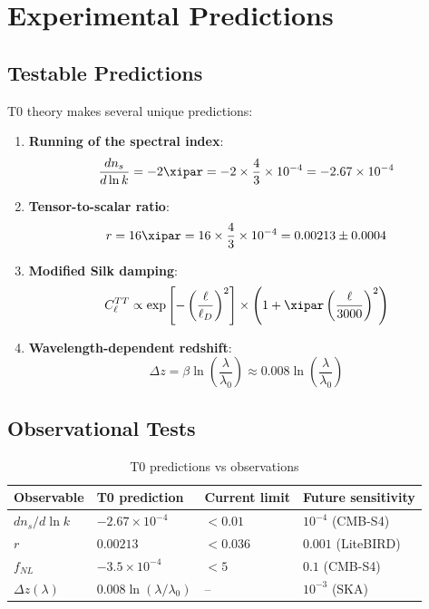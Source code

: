 	\section{Experimental Predictions}
	\label{sec:predictions}
	
	\subsection{Testable Predictions}
	
	T0 theory makes several unique predictions:
	
	\begin{enumerate}
		\item \textbf{Running of the spectral index}:
		\begin{equation}
			\frac{dn_s}{d\ln k} = -2\xipar = -2 \times \frac{4}{3} \times 10^{-4} = -2.67 \times 10^{-4}
		\end{equation}
		
		\item \textbf{Tensor-to-scalar ratio}:
		\begin{equation}
			r = 16\xipar = 16 \times \frac{4}{3} \times 10^{-4} = 0.00213 \pm 0.0004
		\end{equation}
		
		\item \textbf{Modified Silk damping}:
		\begin{equation}
			C_\ell^{TT} \propto \exp\left[-\left(\frac{\ell}{\ell_D}\right)^2\right] \times \left(1 + \xipar \left(\frac{\ell}{3000}\right)^2\right)
		\end{equation}
		
		\item \textbf{Wavelength-dependent redshift}:
		\begin{equation}
			\Delta z = \beta \ln\left(\frac{\lambda}{\lambda_0}\right) \approx 0.008 \ln\left(\frac{\lambda}{\lambda_0}\right)
		\end{equation}
	\end{enumerate}
	
	\subsection{Observational Tests}
	
	\begin{table}[htbp]
		\centering
		\caption{T0 predictions vs observations}
		\begin{tabular}{p{3cm}p{3cm}p{3cm}p{3cm}}
			\toprule
			Observable & T0 prediction & Current limit & Future sensitivity \\
			\midrule
			$dn_s/d\ln k$ & $-2.67 \times 10^{-4}$ & $< 0.01$ & $10^{-4}$ (CMB-S4) \\
			$r$ & $0.00213$ & $< 0.036$ & $0.001$ (LiteBIRD) \\
			$f_{NL}$ & $-3.5 \times 10^{-4}$ & $< 5$ & $0.1$ (CMB-S4) \\
			$\Delta z(\lambda)$ & $0.008\ln(\lambda/\lambda_0)$ & -- & $10^{-3}$ (SKA) \\
			\bottomrule
		\end{tabular}
	\end{table}
	

